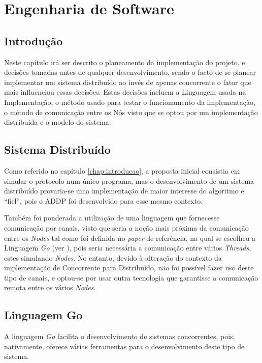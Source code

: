 \chapter{Engenharia de Software}
\label{chap:engenharia}

\section{Introdução}
\label{engenharia:sec:introducao}
Neste capítulo irá ser descrito o planeamento da implementação do projeto, e decisões tomadas antes de qualquer desenvolvimento, sendo o facto de se planear implementar um sistema distribuído ao invés de 
apenas concorrente o fator que mais influenciou essas decisões.
Estas decisões incluem a Linguagem usada na Implementação, o método usado para testar o funcionamento da implementação,
o método de comunicação entre os Nós visto que se optou por um implementação distribuída e o modelo do sistema.

\section{Sistema Distribuído}
\label{engenharia:sec:sistema}
Como referido no capítulo \ref{chap:introducao}, a proposta inicial consistia em simular o protocolo num único programa,
mas o desenvolvimento de um sistema distribuído 
provaria-se uma implementação de maior interesse do algoritmo e ``fiel'', pois o \acs*{ADDP} foi desenvolvido para esse mesmo contexto.

Também foi ponderada a utilização de uma linguagem que fornecesse comunicação por canais,
visto que seria a noção mais próxima da comunicação entre os \emph{Nodes} tal como foi definida no \emph{paper} de referência, na qual se
escolheu a Linguagem \emph{Go} (ver \label{implementacao:subsec:go}), pois seria necessária a comunicação entre vários \emph{Threads}, estes simulando \emph{Nodes}.
No entanto, devido à alteração do contexto da implementação de Concorrente para Distribuído, não foi possível fazer uso deste tipo de canais, 
e optou-se por usar outra tecnologia que garantisse a comunicação remota entre os vários \emph{Nodes}.


\section{Linguagem Go}
\label{engenharia:sec:go}

A linguagem \emph{Go} facilita o desenvolvimento de sistemas concorrentes, pois, nativamente, oferece várias ferramentas para o desenvolvimento deste tipo de sistema.

